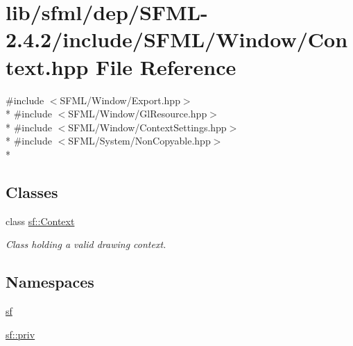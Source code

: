 \hypertarget{sfml_2dep_2_s_f_m_l-2_84_82_2include_2_s_f_m_l_2_window_2_context_8hpp}{\section{lib/sfml/dep/\-S\-F\-M\-L-\/2.4.2/include/\-S\-F\-M\-L/\-Window/\-Context.hpp File Reference}
\label{sfml_2dep_2_s_f_m_l-2_84_82_2include_2_s_f_m_l_2_window_2_context_8hpp}
}
{\ttfamily \#include $<$S\-F\-M\-L/\-Window/\-Export.\-hpp$>$}\\*
{\ttfamily \#include $<$S\-F\-M\-L/\-Window/\-Gl\-Resource.\-hpp$>$}\\*
{\ttfamily \#include $<$S\-F\-M\-L/\-Window/\-Context\-Settings.\-hpp$>$}\\*
{\ttfamily \#include $<$S\-F\-M\-L/\-System/\-Non\-Copyable.\-hpp$>$}\\*
\subsection*{Classes}
\begin{DoxyCompactItemize}
\item 
class \hyperlink{classsf_1_1_context}{sf\-::\-Context}
\begin{DoxyCompactList}\small\item\em Class holding a valid drawing context. \end{DoxyCompactList}\end{DoxyCompactItemize}
\subsection*{Namespaces}
\begin{DoxyCompactItemize}
\item 
\hyperlink{namespacesf}{sf}
\item 
\hyperlink{namespacesf_1_1priv}{sf\-::priv}
\end{DoxyCompactItemize}
